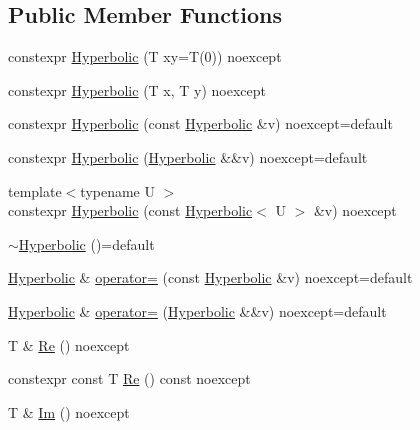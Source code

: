 \subsection*{Public Member Functions}
\begin{DoxyCompactItemize}
\item 
constexpr \mbox{\hyperlink{structmage_1_1_hyperbolic_a8ea2afb84fb80f5bffb8ddb425e3987a}{Hyperbolic}} (T xy=T(0)) noexcept
\item 
constexpr \mbox{\hyperlink{structmage_1_1_hyperbolic_ad4ae65501723843bd7258f94a724b01c}{Hyperbolic}} (T x, T y) noexcept
\item 
constexpr \mbox{\hyperlink{structmage_1_1_hyperbolic_a4f0508de351703405ade230dc4d6b77b}{Hyperbolic}} (const \mbox{\hyperlink{structmage_1_1_hyperbolic}{Hyperbolic}} \&v) noexcept=default
\item 
constexpr \mbox{\hyperlink{structmage_1_1_hyperbolic_af2a6bccf73a3ff0df3d9640d17cbfb37}{Hyperbolic}} (\mbox{\hyperlink{structmage_1_1_hyperbolic}{Hyperbolic}} \&\&v) noexcept=default
\item 
{\footnotesize template$<$typename U $>$ }\\constexpr \mbox{\hyperlink{structmage_1_1_hyperbolic_a4c4c2fde770904cbc45e5a7889b1a2e6}{Hyperbolic}} (const \mbox{\hyperlink{structmage_1_1_hyperbolic}{Hyperbolic}}$<$ U $>$ \&v) noexcept
\item 
\mbox{\hyperlink{structmage_1_1_hyperbolic_a893662ddeea9d31b08b24c7b848a1b48}{$\sim$\+Hyperbolic}} ()=default
\item 
\mbox{\hyperlink{structmage_1_1_hyperbolic}{Hyperbolic}} \& \mbox{\hyperlink{structmage_1_1_hyperbolic_a05e2a6cf6b2974a18b2d52f092c472fb}{operator=}} (const \mbox{\hyperlink{structmage_1_1_hyperbolic}{Hyperbolic}} \&v) noexcept=default
\item 
\mbox{\hyperlink{structmage_1_1_hyperbolic}{Hyperbolic}} \& \mbox{\hyperlink{structmage_1_1_hyperbolic_a81b6e027f2fba1366d562a57e4e954ee}{operator=}} (\mbox{\hyperlink{structmage_1_1_hyperbolic}{Hyperbolic}} \&\&v) noexcept=default
\item 
T \& \mbox{\hyperlink{structmage_1_1_hyperbolic_a381a404eb017725183d573c12f3372b3}{Re}} () noexcept
\item 
constexpr const T \mbox{\hyperlink{structmage_1_1_hyperbolic_ad4affddcdd90c6f8e88c9fad6070b414}{Re}} () const noexcept
\item 
T \& \mbox{\hyperlink{structmage_1_1_hyperbolic_a36ebff123d7654b33a0f584ef31a17d6}{Im}} () noexcept
\item 

\end{DoxyCompactItemize}
